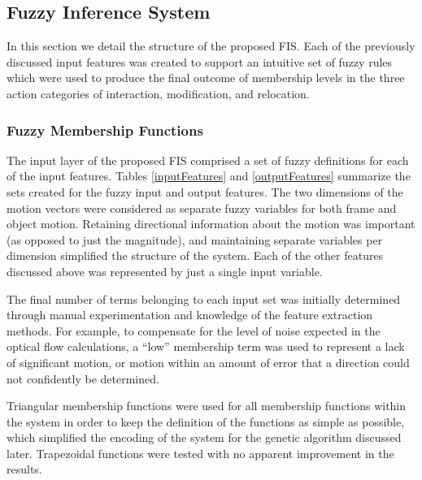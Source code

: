 \documentclass[12pt]{report}
\begin{document}
\subsection{Fuzzy Inference System}
In this section we detail the structure of the proposed FIS. Each of the previously discussed input features was created to support an intuitive set of fuzzy rules which were used to produce the final outcome of membership levels in the three action categories of interaction, modification, and relocation.

\subsubsection{Fuzzy Membership Functions}
The input layer of the proposed FIS comprised a set of fuzzy definitions for each of the input features. Tables \ref{inputFeatures} and \ref{outputFeatures} summarize the sets created for the fuzzy input and output features. The two dimensions of the motion vectors were considered as separate fuzzy variables for both frame and object motion. Retaining directional information about the motion was important (as opposed to just the magnitude), and maintaining separate variables per dimension simplified the structure of the system. Each of the other features discussed above was represented by just a single input variable. 

The final number of terms belonging to each input set was initially determined through manual experimentation and knowledge of the feature extraction methods. For example, to compensate for the level of noise expected in the optical flow calculations, a ``low'' membership term was used to represent a lack of significant motion, or motion within an amount of error that a direction could not confidently be determined. 

Triangular membership functions were used for all membership functions within the system in order to keep the definition of the functions as simple as possible, which simplified the encoding of the system for the genetic algorithm discussed later. Trapezoidal functions were tested with no apparent improvement in the results.
\end{document}
